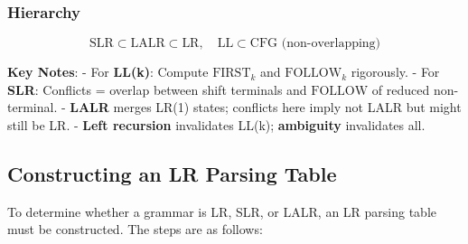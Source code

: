 \subsubsection*{Hierarchy}
\[
\text{SLR} \subset \text{LALR} \subset \text{LR}, \quad \text{LL} \subset \text{CFG (non-overlapping)}
\]

\textbf{Key Notes}:
- For \textbf{LL(k)}: Compute \(\text{FIRST}_k\) and \(\text{FOLLOW}_k\) rigorously.
- For \textbf{SLR}: Conflicts = overlap between shift terminals and \(\text{FOLLOW}\) of reduced non-terminal.
- \textbf{LALR} merges LR(1) states; conflicts here imply not LALR but might still be LR.
- \textbf{Left recursion} invalidates LL(k); \textbf{ambiguity} invalidates all.

\subsection{Constructing an LR Parsing Table}
To determine whether a grammar is LR, SLR, or LALR, an LR parsing table must be constructed. The steps are as follows:

